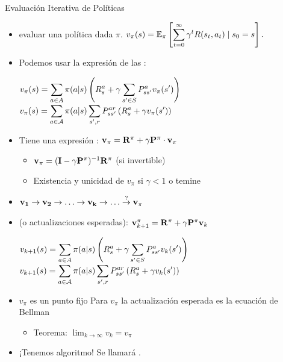 \documentclass[10pt, envcountsect, handout, aspectratio=1610, hyperref={hypertexnames=true}]{beamer}
\begin{document}
\begin{frame}{Evaluación Iterativa de Políticas}

\begin{itemize}
\item 
{} evaluar una política dada $\pi$. $\displaystyle
			v_\pi(s) = \mathbb{E}_\pi \left[ \sum_{t=0}^\infty \gamma^t R(s_t, a_t) \mid s_0 = s \right].
		$
\item Podemos usar la expresión de las :

$\displaystyle v_\pi(s) = \sum_{a \in A} \pi(a|s) \left(R^a_s + \gamma \sum_{s' \in S} P^a_{ss'} v_\pi(s')\right)$\hfill 
$\displaystyle v_\pi(s)   = \sum_{a\in{\cal A}} \pi(a|s) \sum_{s',r} P_{ss'}^{ar} \left( R_s^a + \gamma v_\pi(s') \right)$

\item Tiene una expresión : $\mathbf{v}_\pi = \mathbf{R}^\pi+ \gamma \mathbf{P}^\pi \cdot \mathbf{v}_\pi $ \;
	 
	\begin{itemize}
	\item $\mathbf{v_\pi} = (\mathbf{I} - \gamma \mathbf{P}^\pi)^{-1} \mathbf{R}^\pi$ (si invertible)
	\item Existencia y unicidad de $v_\pi$ si $\gamma < 1$ o temine
	\end{itemize}
	
\item {}  $\mathbf{v_1} \to \mathbf{v_2} \to \ldots \to \mathbf{v_k} \to \ldots \stackrel{?}{\to} \mathbf{v}_\pi$
	
\item {} (o actualizaciones esperadas):  $\mathbf{v}^\pi_{k+1} = \mathbf{R}^\pi + \gamma \mathbf{P}^\pi \mathbf{v}_k$

$\displaystyle v_{k+1}(s) = \sum_{a \in A} \pi(a|s) \left(R^a_s + \gamma \sum_{s' \in S} P^a_{ss'} v_k(s')\right)$\hfill 
$\displaystyle v_{k+1}(s)   = \sum_{a\in{\cal A}} \pi(a|s) \sum_{s',r} P_{ss'}^{ar} \left( R_s^a + \gamma v_k(s') \right)$

\item $v_\pi$ es un punto fijo {\color{reddark} \faArrowRight{}} Para $v_\pi$ la actualización esperada es la ecuación de Bellman
	\begin{itemize}
	\item Teorema: $\lim_{k\rightarrow \infty} v_k = v_\pi$
	\end{itemize}

\item ¡Tenemos algoritmo! Se llamará .
\end{itemize}

\end{frame}
\end{document}
